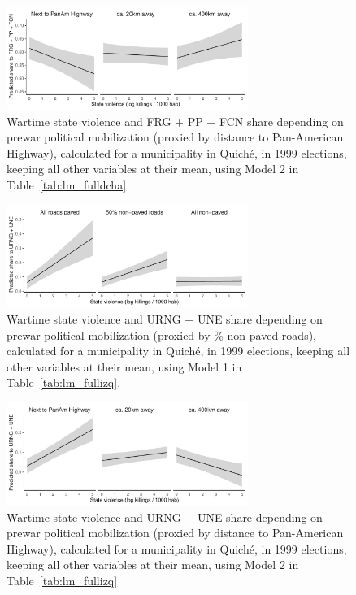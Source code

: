 \documentclass[a4paper, 12pt, notitlepage]{article}
\begin{document}
\begin{figure}[htb!]
  \centering
    \includegraphics[width = 0.7\textwidth]{img/pp_fulldcha_panam}

  \caption{Wartime state violence and FRG + PP + FCN share depending on prewar political mobilization (proxied by distance to Pan-American Highway), calculated for a municipality in Quiché, in 1999 elections, keeping all other variables at their mean, using Model 2 in Table~\ref{tab:lm_fulldcha}} \label{fig:pp_fulldcha_panam}

\end{figure}

\clearpage
\begin{figure}[htb!]
  \centering
    \includegraphics[width = 0.7\textwidth]{img/pp_fullizq_roads}

  \caption{Wartime state violence and URNG + UNE share depending on prewar political mobilization (proxied by \% non-paved roads), calculated for a municipality in Quiché, in 1999 elections, keeping all other variables at their mean, using Model 1 in Table~\ref{tab:lm_fullizq}.} \label{fig:pp_fullizq_roads}

\end{figure}

\begin{figure}[htb!]
  \centering
    \includegraphics[width = 0.7\textwidth]{img/pp_fullizq_panam}

  \caption{Wartime state violence and URNG + UNE share depending on prewar political mobilization (proxied by distance to Pan-American Highway), calculated for a municipality in Quiché, in 1999 elections, keeping all other variables at their mean, using Model 2 in Table~\ref{tab:lm_fullizq}} \label{fig:pp_fullizq_panam}

\end{figure}
\end{document}

